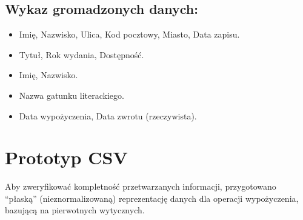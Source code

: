 \documentclass[letterpaper,10pt,english]{sphinxmanual}
\begin{document}
\subsection{Wykaz gromadzonych danych:}
\label{\detokenize{rozdzial_3/index:wykaz-gromadzonych-danych}}\begin{itemize}
\item {} 
\sphinxAtStartPar
{} Imię, Nazwisko, Ulica, Kod pocztowy, Miasto, Data zapisu.

\item {} 
\sphinxAtStartPar
{} Tytuł, Rok wydania, Dostępność.

\item {} 
\sphinxAtStartPar
{} Imię, Nazwisko.

\item {} 
\sphinxAtStartPar
{} Nazwa gatunku literackiego.

\item {} 
\sphinxAtStartPar
{} Data wypożyczenia, Data zwrotu (rzeczywista).

\end{itemize}


\section{Prototyp CSV}
\label{\detokenize{rozdzial_3/index:prototyp-csv}}
\sphinxAtStartPar
Aby zweryfikować kompletność przetwarzanych informacji, przygotowano “płaską” (nieznormalizowaną) reprezentację danych dla operacji wypożyczenia, bazującą na pierwotnych wytycznych.
\end{document}
